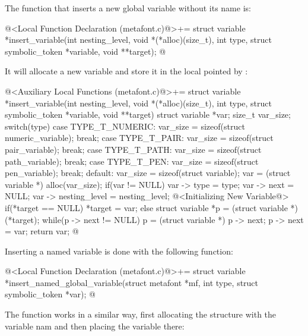 The function that inserts a new global variable without its name is:

\iniciocodigo
@<Local Function Declaration (metafont.c)@>+=
struct variable *insert_variable(int nesting_level,
                                 void *(*alloc)(size_t),
                                 int type,
                                 struct symbolic_token *variable,
                                 void **target);
@
\fimcodigo

It will allocate a new variable and store it in the local pointed
by :

\iniciocodigo
@<Auxiliary Local Functions (metafont.c)@>+=
struct variable *insert_variable(int nesting_level,
                                 void *(*alloc)(size_t),
                                 int type,
                                 struct symbolic_token *variable,
                                 void **target){
  struct variable *var;
  size_t var_size;
  switch(type){
    case TYPE_T_NUMERIC:
      var_size = sizeof(struct numeric_variable);
      break;
    case TYPE_T_PAIR:
      var_size = sizeof(struct pair_variable);
      break;
    case TYPE_T_PATH:
      var_size = sizeof(struct path_variable);
      break;
    case TYPE_T_PEN:
      var_size = sizeof(struct pen_variable);
      break;
    default:
      var_size = sizeof(struct variable);
  }
  var = (struct variable *) alloc(var_size);
  if(var != NULL){
    var -> type = type;
    var -> next = NULL;
    var -> nesting_level = nesting_level;
    @<Initializing New Variable@>
  }
  if(*target == NULL)
    *target = var;
  else{
    struct variable *p = (struct variable *) (*target);
    while(p -> next != NULL)
      p = (struct variable *) p -> next;
    p -> next = var;
  }
  return var;
}
@
\fimcodigo

Inserting a named variable is done with the following function:

\iniciocodigo
@<Local Function Declaration (metafont.c)@>+=
struct variable *insert_named_global_variable(struct metafont *mf,
                                             int type,
                                             struct symbolic_token *var);
@
\fimcodigo

The function works in a similar way, first allocating the structure
with the variable nam and then placing the variable there:

